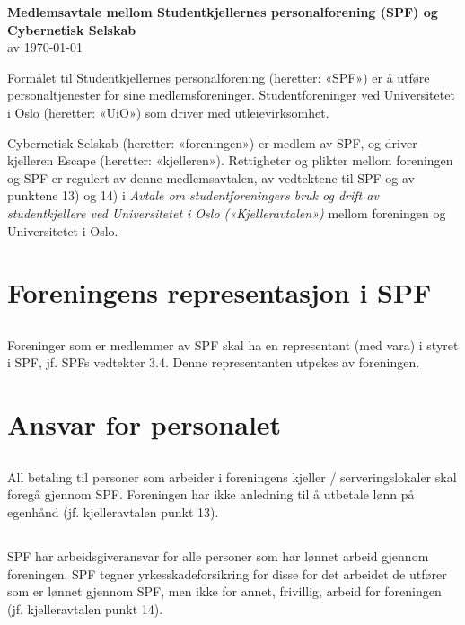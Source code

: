 \documentclass[12pt]{article}
\begin{document}
\pagestyle{fancy}
\fancyhf{}

\begin{center}
    {\LARGE\textbf{Medlemsavtale mellom Studentkjellernes personalforening
    (SPF) og Cybernetisk Selskab}}\\[7pt]
    av \today\\[24pt]
\end{center}

Formålet til Studentkjellernes
personalforening (heretter: «SPF») er å utføre 
personaltjenester for sine medlemsforeninger. Studentforeninger ved Universitetet i Oslo
(heretter: «UiO») som driver med utleievirksomhet.

Cybernetisk Selskab (heretter: «foreningen»)
er medlem av SPF, og driver kjelleren Escape (heretter: «kjelleren»). Rettigheter og plikter mellom 
foreningen og SPF er regulert av denne 
medlemsavtalen, av vedtektene til SPF og av punktene 13) og 
14) i \textit{Avtale om studentforeningers bruk og drift av 
studentkjellere ved Universitetet i Oslo
(«Kjelleravtalen»)} mellom foreningen og 
Universitetet i Oslo.
\section{Foreningens representasjon i SPF}
\label{sec:1}
\subsection{}
\label{sub:1.1}
Foreninger som er medlemmer av SPF skal ha en 
representant (med vara) i styret i SPF, jf. SPFs 
vedtekter 3.4. Denne representanten utpekes av 
foreningen.
\section{Ansvar for personalet}
\label{sec:2}
\subsection{}
\label{sub:2.1}
All betaling til personer som arbeider i foreningens kjeller / serveringslokaler
skal foregå gjennom SPF. Foreningen har ikke anledning til å utbetale lønn på egenhånd 
(jf. kjelleravtalen punkt 13).
\subsection{}
\label{sub:2.2}
SPF har arbeidsgiveransvar for alle personer som 
har lønnet arbeid gjennom foreningen. SPF tegner 
yrkesskadeforsikring for disse for det arbeidet de 
utfører som er lønnet gjennom SPF, men ikke for 
annet, frivillig, arbeid for foreningen (jf. 
kjelleravtalen punkt 14).
\end{document}

